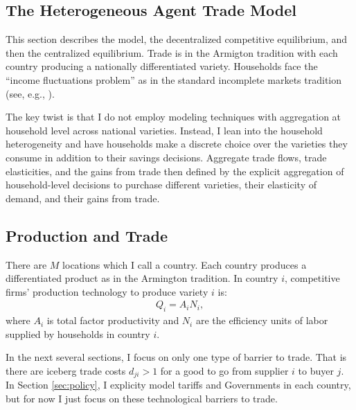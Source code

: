 \documentclass[12pt,pdftex]{article}
\begin{document}
\begin{onehalfspacing}
\hspace{-0.05cm}



\thispagestyle{empty}
\newpage
\normalsize

\section{The Heterogeneous Agent Trade Model}

This section describes the model, the decentralized competitive equilibrium, and then the centralized equilibrium. Trade is in the Armigton tradition with each country producing a nationally differentiated variety. Households face the ``income fluctuations problem'' as in the standard incomplete markets tradition (see, e.g., \citet{ljungqvist2012recursive}). 

The key twist is that I do not employ modeling techniques with aggregation at household level across national varieties. Instead, I lean into the household heterogeneity and have households make a discrete choice over the varieties they consume in addition to their savings decisions. Aggregate trade flows, trade elasticities, and the gains from trade then defined by the explicit aggregation of household-level decisions to purchase different varieties, their elasticity of demand, and their gains from trade.

\subsection{Production and Trade}\label{sec:trade}

There are $M$ locations which I call a country. Each country produces a differentiated product as in the Armington tradition. In country $i$, competitive firms' production technology to produce variety $i$ is:
\begin{align}
Q_i = A_i N_i,
\label{eq:production}
\end{align}
where $A_i$ is total factor productivity and $N_i$ are the efficiency units of labor supplied by households in country $i$.

In the next several sections, I focus on only one type of barrier to trade. That is there are iceberg trade costs $d_{ji} > 1$ for a good to go from supplier $i$ to buyer $j$. In Section \ref{sec:policy}, I explicity model  tariffs and Governments in each country, but for now I just focus on these technological barriers to trade.


\end{onehalfspacing}
\end{document}
